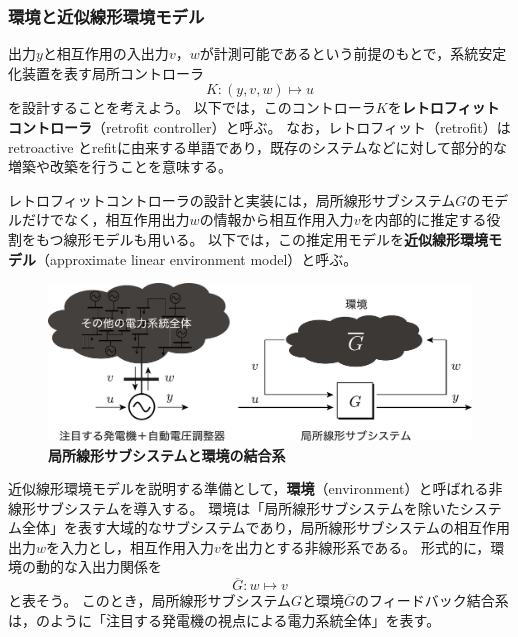 \documentclass[tombow,dvipdfmx]{corona-a5-1.1}
\begin{document}
\smallskip
\subsubsection{環境と近似線形環境モデル}

出力$y$と相互作用の入出力$v$，$w$が計測可能であるという前提のもとで，系統安定化装置を表す局所コントローラ
\[
K : (y,v,w)\mapsto u
\]
を設計することを考えよう。
以下では，このコントローラ$K$を\textbf{レトロフィットコントローラ}（retrofit controller）と呼ぶ。
なお，レトロフィット（retrofit）はretroactive とrefitに由来する単語であり，既存のシステムなどに対して部分的な増築や改築を行うことを意味する。

レトロフィットコントローラの設計と実装には，局所線形サブシステム$G$のモデルだけでなく，相互作用出力$w$の情報から相互作用入力$v$を内部的に推定する役割をもつ線形モデルも用いる。
以下では，この推定用モデルを\textbf{近似線形環境モデル}（approximate linear environment model）と呼ぶ。


\begin{figure}[t]
\centering
\includegraphics[width = .99\linewidth]{figs/retconsys2}
\medskip
\caption{\textbf{局所線形サブシステムと環境の結合系}}
\label{fig:retconsys}
\medskip
\end{figure}


近似線形環境モデルを説明する準備として，\textbf{環境}（environment）と呼ばれる非線形サブシステムを導入する。
環境は「局所線形サブシステムを除いたシステム全体」を表す大域的なサブシステムであり，局所線形サブシステムの相互作用出力$w$を入力とし，相互作用入力$v$を出力とする非線形系である。
形式的に，環境の動的な入出力関係を
\[
\overline{G} : w\mapsto v
\]
と表そう。
このとき，局所線形サブシステム$G$と環境$\overline{G}$のフィードバック結合系は，のように「注目する発電機の視点による電力系統全体」を表す。
\end{document}
